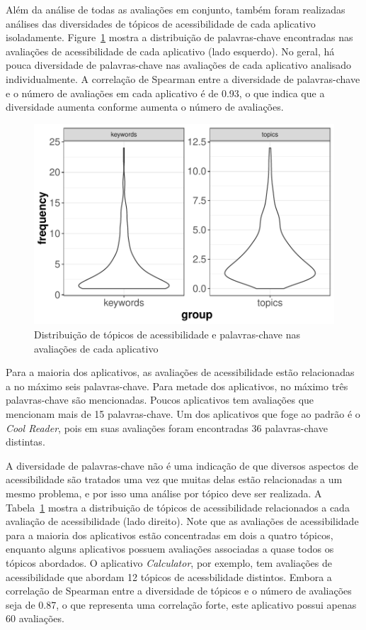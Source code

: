 Além da análise de todas as avaliações em conjunto, também foram realizadas análises das diversidades de tópicos de acessibilidade de cada aplicativo isoladamente. 
Figure~\ref{fig:distributiontopicsapps} mostra a distribuição de palavras-chave encontradas nas avaliações de acessibilidade de cada aplicativo (lado esquerdo). 
No geral, há pouca diversidade de palavras-chave nas avaliações de cada aplicativo analisado individualmente. 
A correlação de Spearman entre a diversidade de palavras-chave e o número de avaliações em cada aplicativo é de 0.93, o que indica que a diversidade aumenta conforme aumenta o número de avaliações.


 \begin{figure}[!htb]
 \centering
\includegraphics[scale=0.8]{imagens/distribution-topics-keywords.pdf}
\caption{Distribuição de tópicos de acessibilidade e palavras-chave nas avaliações de cada aplicativo}
\label{fig:distributiontopicsapps}
\end{figure}


Para a maioria dos aplicativos, as avaliações de acessibilidade estão relacionadas a no máximo seis palavras-chave. 
Para metade dos aplicativos, no máximo três palavras-chave são mencionadas. 
Poucos aplicativos tem avaliações que mencionam mais de 15 palavras-chave. 
Um dos aplicativos que foge ao padrão é o \textit{Cool Reader}, pois em suas avaliações foram encontradas 36 palavras-chave distintas. 


A diversidade de palavras-chave não é uma indicação de que diversos aspectos de acessibilidade são tratados uma vez que muitas delas estão relacionadas a um mesmo problema, e por isso uma análise por tópico deve ser realizada. 
A Tabela~\ref{fig:distributiontopicsapps} mostra a distribuição de tópicos de acessibilidade relacionados a cada avaliação de acessibilidade (lado direito). 
Note que as avaliações de acessibilidade para a maioria dos aplicativos estão concentradas em dois a quatro tópicos, enquanto alguns aplicativos possuem avaliações associadas a quase todos os tópicos abordados. 
O aplicativo \textit{Calculator}, por exemplo, tem avaliações de acessibilidade que abordam 12 tópicos de acessbilidade distintos. 
Embora a correlação de Spearman entre a diversidade de tópicos e o número de avaliações seja de 0.87, o que representa uma correlação forte, este aplicativo possui apenas 60 avaliações. \newline



